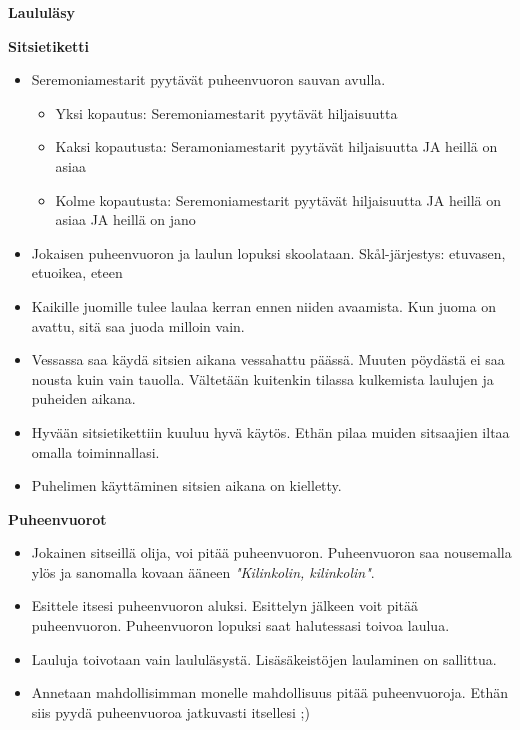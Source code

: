 \documentclass[12pt]{article} %
\begin{document}
\thispagestyle{empty}
\vspace*{1cm}
\begin{center}
\vspace{1cm}
\LARGE \textbf{Laululäsy}
\end{center}

\clearpage


\begin{center}
\textbf{Sitsietiketti}
\vspace{0.3cm}



\begin{itemize}
    \item Seremoniamestarit pyytävät puheenvuoron sauvan avulla.
    \begin{itemize}
        \item Yksi kopautus: Seremoniamestarit pyytävät hiljaisuutta
        \item Kaksi kopautusta: Seramoniamestarit pyytävät hiljaisuutta JA heillä on asiaa
        \item Kolme kopautusta: Seremoniamestarit pyytävät hiljaisuutta JA heillä on asiaa JA heillä on jano
    \end{itemize}
    \item Jokaisen puheenvuoron ja laulun lopuksi skoolataan. Skål-järjestys: etuvasen, etuoikea, eteen
    \item Kaikille juomille tulee laulaa kerran ennen niiden avaamista. Kun juoma on avattu, sitä saa juoda milloin vain.
    \item Vessassa saa käydä sitsien aikana vessahattu päässä. Muuten pöydästä ei saa nousta kuin vain tauolla. Vältetään kuitenkin tilassa kulkemista laulujen ja puheiden aikana.
    \item Hyvään sitsietikettiin kuuluu hyvä käytös. Ethän pilaa muiden sitsaajien iltaa omalla toiminnallasi.
    \item Puhelimen käyttäminen sitsien aikana on kielletty.
\end{itemize}

\textbf{Puheenvuorot}
\vspace{0.3cm}
\begin{itemize}
    \item Jokainen sitseillä olija, voi pitää puheenvuoron. Puheenvuoron saa nousemalla ylös ja sanomalla kovaan ääneen \textit{"Kilinkolin, kilinkolin"}.
    \item Esittele itsesi puheenvuoron aluksi. Esittelyn jälkeen voit pitää puheenvuoron. Puheenvuoron lopuksi saat halutessasi toivoa laulua.
    \item Lauluja toivotaan vain laululäsystä. Lisäsäkeistöjen laulaminen on sallittua.
    \item Annetaan mahdollisimman monelle mahdollisuus pitää puheenvuoroja. Ethän siis pyydä puheenvuoroa jatkuvasti itsellesi ;)
\end{itemize}


\end{center}
\end{document}

